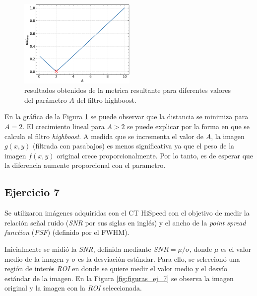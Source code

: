 \documentclass[11pt, twocolumn]{article}
\begin{document}
\begin{figure} [htbp]
  \centering
  \includegraphics[width=0.5\textwidth]{images/ej_6/distance.png}
  \caption{resultados obtenidos de la metrica resultante para diferentes valores del parámetro $A$ del filtro highboost.}
  \label{fig:distance}
\end{figure}

En la gráfica de la Figura \ref{fig:distance} se puede observar que la distancia se minimiza para $A = 2$. El crecimiento lineal para $A > 2$ se puede explicar por la forma en que se calcula el filtro \textit{highboost}. A medida que se incrementa el valor de $A$, la imagen $g(x, y)$ (filtrada con pasabajos) es menos significativa ya que el peso de la imagen $f(x, y)$ original crece proporcionalmente. Por lo tanto, es de esperar que la diferencia aumente proporcional con el parametro.

\subsection*{Ejercicio 7}
Se utilizaron imágenes adquiridas con el CT HiSpeed con el objetivo de medir la relación señal ruido (\textit{SNR} por sus siglas en inglés) y el ancho de la \textit{point spread function} (\textit{PSF}) (definido por el FWHM). 

Inicialmente se midió la \textit{SNR}, definida mediante $SNR = \mu / \sigma$, donde $\mu$ es el valor medio de la imagen y $\sigma$ es la desviación estándar. Para ello, se seleccionó una región de interés \textit{ROI} en donde se quiere medir el valor medio y el desvío estándar de la imagen. En la Figura \ref{fig:figuras_ej_7} se observa la imagen original y la imagen con la \textit{ROI} seleccionada.
\end{document}
